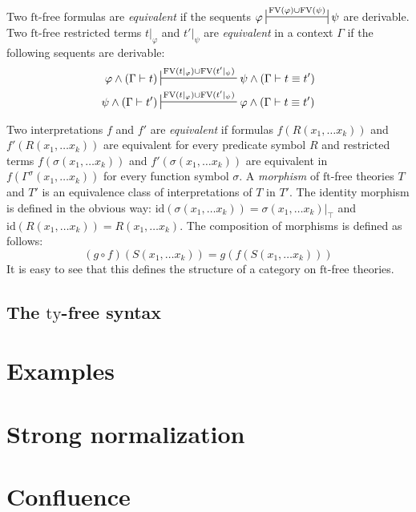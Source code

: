 \documentclass[reqno]{amsart}
\theoremstyle{definition}
\theoremstyle{remark}
\newcommand{\fs}[1]{\mathrm{#1}}
\newcommand{\FV}{\fs{FV}}
\newcommand{\ft}{\fs{ft}}
\newcommand{\ty}{\fs{ty}}
\newcommand{\id}{\fs{id}}
\numberwithin{figure}{section}
\begin{document}
Two $\ft$-free formulas are \emph{equivalent} if the sequents $\varphi \ssststile{}{\FV(\varphi) \cup \FV(\psi)} \psi$ are derivable.
Two $\ft$-free restricted terms $t|_\varphi$ and $t'|_\psi$ are \emph{equivalent} in a context $\Gamma$ if the following sequents are derivable:
\begin{align*}
\varphi \land (\Gamma \vdash t) & \sststile{}{\FV(t|_\varphi) \cup \FV(t'|_\psi)} \psi \land (\Gamma \vdash t \equiv t') \\
\psi \land (\Gamma \vdash t') & \sststile{}{\FV(t|_\varphi) \cup \FV(t'|_\psi)} \varphi \land (\Gamma \vdash t \equiv t')
\end{align*}

Two interpretations $f$ and $f'$ are \emph{equivalent} if formulas $f(R(x_1, \ldots x_k))$ and $f'(R(x_1, \ldots x_k))$ are equivalent for every predicate symbol $R$ and restricted terms $f(\sigma(x_1, \ldots x_k))$ and $f'(\sigma(x_1, \ldots x_k))$ are equivalent in $f(\Gamma^\sigma(x_1, \ldots x_k))$ for every function symbol $\sigma$.
A \emph{morphism} of $\ft$-free theories $T$ and $T'$ is an equivalence class of interpretations of $T$ in $T'$.
The identity morphism is defined in the obvious way: $\id(\sigma(x_1, \ldots x_k)) = \sigma(x_1, \ldots x_k)|_\top$ and $\id(R(x_1, \ldots x_k)) = R(x_1, \ldots x_k)$.
The composition of morphisms is defined as follows:
\[ (g \circ f)(S(x_1, \ldots x_k)) = g(f(S(x_1, \ldots x_k))) \]
It is easy to see that this defines the structure of a category on $\ft$-free theories.


\subsection{The $\ty$-free syntax}
\label{sec:types}

\section{Examples}

\section{Strong normalization}

\section{Confluence}



\end{document}

